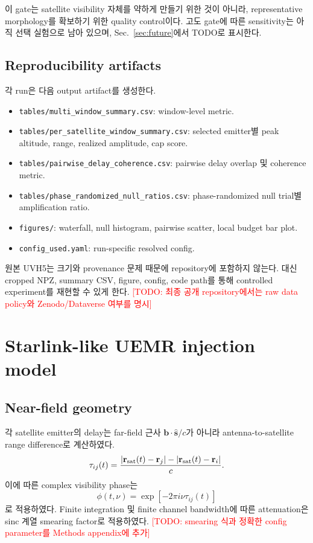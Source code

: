 \documentclass[11pt,a4paper]{article}
\newcommand{\todo}[1]{\textcolor{red}{[TODO: #1]}}
\begin{document}
이 gate는 satellite visibility 자체를 약하게 만들기 위한 것이 아니라, representative morphology를 확보하기 위한 quality control이다.
고도 gate에 따른 sensitivity는 아직 선택 실험으로 남아 있으며, Sec.~\ref{sec:future}에서 TODO로 표시한다.

\subsection{Reproducibility artifacts}

각 run은 다음 output artifact를 생성한다.

\begin{itemize}
  \item \texttt{tables/multi\_window\_summary.csv}: window-level metric.
  \item \texttt{tables/per\_satellite\_window\_summary.csv}: selected emitter별 peak altitude, range, realized amplitude, cap score.
  \item \texttt{tables/pairwise\_delay\_coherence.csv}: pairwise delay overlap 및 coherence metric.
  \item \texttt{tables/phase\_randomized\_null\_ratios.csv}: phase-randomized null trial별 amplification ratio.
  \item \texttt{figures/}: waterfall, null histogram, pairwise scatter, local budget bar plot.
  \item \texttt{config\_used.yaml}: run-specific resolved config.
\end{itemize}

원본 UVH5는 크기와 provenance 문제 때문에 repository에 포함하지 않는다.
대신 cropped NPZ, summary CSV, figure, config, code path를 통해 controlled experiment를 재현할 수 있게 한다.
\todo{최종 공개 repository에서는 raw data policy와 Zenodo/Dataverse 여부를 명시}

\section{Starlink-like UEMR injection model}

\subsection{Near-field geometry}

각 satellite emitter의 delay는 far-field 근사 $ \mathbf{b}\cdot \hat{\mathbf{s}}/c $가 아니라 antenna-to-satellite range difference로 계산하였다.
\begin{equation}
  \tau_{ij}(t)
  =
  \frac{
  \left|\mathbf{r}_{\rm sat}(t)-\mathbf{r}_{j}\right|
  -
  \left|\mathbf{r}_{\rm sat}(t)-\mathbf{r}_{i}\right|
  }{c}.
\end{equation}
이에 따른 complex visibility phase는
\begin{equation}
  \phi(t,\nu)=\exp[-2\pi i\nu\tau_{ij}(t)]
\end{equation}
로 적용하였다.
Finite integration 및 finite channel bandwidth에 따른 attenuation은 sinc 계열 smearing factor로 적용하였다.
\todo{smearing 식과 정확한 config parameter를 Methods appendix에 추가}
\end{document}
